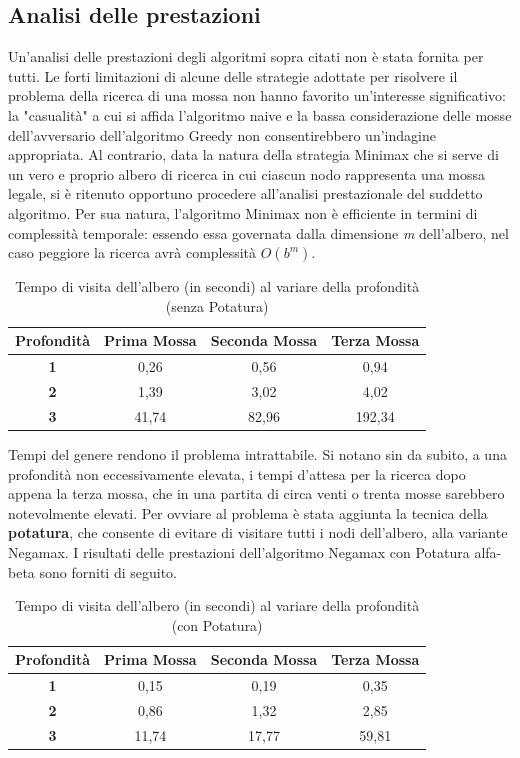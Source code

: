 \subsection{Analisi delle prestazioni}
Un'analisi delle prestazioni degli algoritmi sopra citati non è stata fornita per tutti. Le forti limitazioni di alcune delle strategie adottate per risolvere il problema della ricerca di una mossa non hanno favorito un'interesse significativo: la "casualità" a cui si affida l'algoritmo naive e la bassa considerazione delle mosse dell'avversario dell'algoritmo Greedy non consentirebbero un'indagine appropriata. Al contrario, data la natura della strategia Minimax che si serve di un vero e proprio albero di ricerca in cui ciascun nodo rappresenta una mossa legale, si è ritenuto opportuno procedere all'analisi prestazionale del suddetto algoritmo. Per sua natura, l'algoritmo Minimax non è efficiente in termini di complessità temporale: essendo essa governata dalla dimensione \textit{m} dell'albero, nel caso peggiore la ricerca avrà complessità $O(b^m)$.

\begin{table}[!htb]
    \centering
    \begin{tabular}{|c|c|c|c|}
\hline
\textbf{Profondità} & \textbf{Prima Mossa} & \textbf{Seconda Mossa} & \textbf{Terza Mossa}\\
\hline
\textbf{1} & 0,26 & 0,56 & 0,94\\
\hline
\textbf{2} & 1,39 & 3,02 & 4,02\\
\hline
\textbf{3} & 41,74 & 82,96 & 192,34\\
\hline
\end{tabular}
    \caption{Tempo di visita dell'albero (in secondi) al variare della profondità (senza Potatura)}
    \label{tab:my_label}
\end{table}

Tempi del genere rendono il problema intrattabile. Si notano sin da subito, a una profondità non eccessivamente elevata, i tempi d'attesa per la ricerca dopo appena la terza mossa, che in una partita di circa venti o trenta mosse sarebbero notevolmente elevati. Per ovviare al problema è stata aggiunta la tecnica della \textbf{potatura}, che consente di evitare di visitare tutti i nodi dell'albero, alla variante Negamax. I risultati delle prestazioni dell'algoritmo Negamax con Potatura alfa-beta sono forniti di seguito.

\begin{table}[!htb]
    \centering
    \begin{tabular}{|c|c|c|c|}
\hline
\textbf{Profondità} & \textbf{Prima Mossa} & \textbf{Seconda Mossa} & \textbf{Terza Mossa}\\
\hline
\textbf{1} & 0,15 & 0,19 & 0,35\\
\hline
\textbf{2} & 0,86 & 1,32 & 2,85\\
\hline
\textbf{3} & 11,74 & 17,77 & 59,81\\
\hline
\end{tabular}
    \caption{Tempo di visita dell'albero (in secondi) al variare della profondità (con Potatura)}
    \label{tab:my_label}
\end{table}

